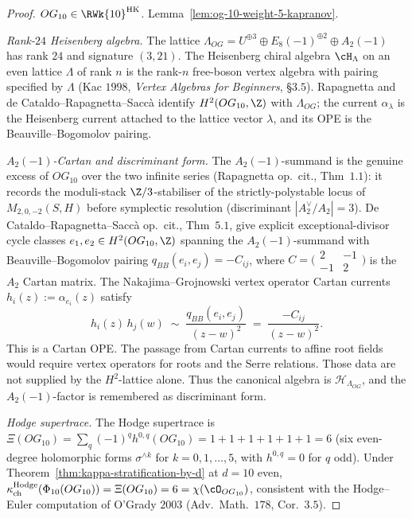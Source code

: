 \begin{proof}
\emph{\(OG_{10}\in\RWk{10}^{\mathrm{HK}}\).}
Lemma~\ref{lem:og-10-weight-5-kapranov}.

\emph{Rank-\(24\) Heisenberg algebra.}
The lattice $\Lambda_{OG} = U^{\oplus 3} \oplus E_8(-1)^{\oplus 2}
\oplus A_2(-1)$ has rank $24$ and signature $(3, 21)$. The
Heisenberg chiral algebra $\cH_\Lambda$ on an even lattice
$\Lambda$ of rank $n$ is the rank-$n$ free-boson vertex algebra
with pairing specified by $\Lambda$ (Kac $1998$,
\emph{Vertex Algebras for Beginners}, \S$3.5$). Rapagnetta and
de Cataldo--Rapagnetta--Sacc\`a identify \(H^2(OG_{10},\Z)\) with
\(\Lambda_{OG}\); the current \(\alpha_\lambda\) is the Heisenberg current
attached to the lattice vector \(\lambda\), and its OPE is the
Beauville--Bogomolov pairing.

\emph{\(A_2(-1)\)-Cartan and discriminant form.}
The $A_2(-1)$-summand is the genuine excess of $OG_{10}$ over the
two infinite series (Rapagnetta op.\ cit., Thm~$1.1$): it records
the moduli-stack $\Z/3$-stabiliser of the strictly-polystable
locus of $M_{2, 0, -2}(S, H)$ before symplectic resolution
(discriminant $|A_2^\vee/A_2| = 3$). De Cataldo--Rapagnetta--Sacc\`a
op.\ cit., Thm~$5.1$, give explicit exceptional-divisor cycle classes
\(e_1,e_2\in H^2(OG_{10},\Z)\) spanning the
$A_2(-1)$-summand with Beauville--Bogomolov pairing
$q_{BB}(e_i, e_j) = -C_{ij}$, where
$C = \bigl(\begin{smallmatrix} 2 & -1 \\ -1 & 2 \end{smallmatrix}\bigr)$
is the $A_2$ Cartan matrix. The Nakajima--Grojnowski vertex
operator Cartan currents $h_i(z) := \alpha_{e_i}(z)$ satisfy
\[
 h_i(z)\, h_j(w) \;\sim\; \frac{q_{BB}(e_i, e_j)}{(z - w)^2}
 \;=\; \frac{-C_{ij}}{(z - w)^2}.
\]
This is a Cartan OPE. The passage from Cartan currents to affine root
fields would require vertex operators for roots and the Serre relations.
Those data are not supplied by the \(H^2\)-lattice alone. Thus the
canonical algebra is \(\mathcal H_{\Lambda_{OG}}\), and the
\(A_2(-1)\)-factor is remembered as discriminant form.

\emph{Hodge supertrace.}
The Hodge supertrace is
$\Xi(OG_{10}) = \sum_q (-1)^q h^{0, q}(OG_{10}) = 1 + 1 + 1 + 1
+ 1 + 1 = 6$ (six even-degree holomorphic forms
$\sigma^{\wedge k}$ for $k = 0, 1, \ldots, 5$, with
$h^{0, q} = 0$ for $q$ odd). Under
Theorem~\ref{thm:kappa-stratification-by-d} at $d = 10$ even,
$\kappa_{\mathrm{ch}}^{\mathrm{Hodge}}(\Phi_{10}(OG_{10})) = \Xi(OG_{10}) = 6 =
\chi(\cO_{OG_{10}})$, consistent with the Hodge--Euler
computation of O'Grady $2003$ (Adv.\ Math.~$178$, Cor.~$3.5$).
\end{proof}

